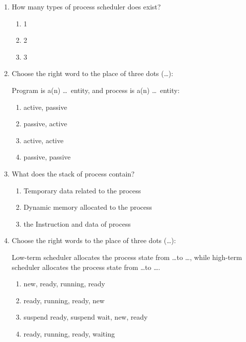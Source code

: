 \documentclass[paper=8.5in:11in]{scrartcl}
\begin{document}

\begin{enumerate}

\item How many types of process scheduler does exist?

\begin{enumerate}[label=\alph*)]

\item 1
\item 2
\item 3

\end{enumerate}

\item Choose the right word to the place of three dots (\ldots):

Program is a(n) \ldots \ entity, and process is a(n) \ldots \ entity:
\begin{enumerate}[label=\alph*)]
\item active, passive
\item passive, active
\item active, active
\item passive, passive
\end{enumerate}

\item What does the stack of process contain?

\begin{enumerate}[label=\alph*)]

\item Temporary data related to the process
\item Dynamic memory allocated to the process
\item the Instruction and data of process

\end{enumerate}

\item Choose the right words to the place of three dots (\ldots):

Low-term scheduler allocates the process state from \ldots to \ldots, while high-term scheduler allocates the process state from \ldots to \ldots.
\begin{enumerate}[label=\alph*)]

\item new, ready, running, ready
\item ready, running, ready, new
\item suspend ready, suspend wait, new, ready
\item ready, running, ready, waiting


\end{enumerate}
\end{enumerate}
\end{document}
